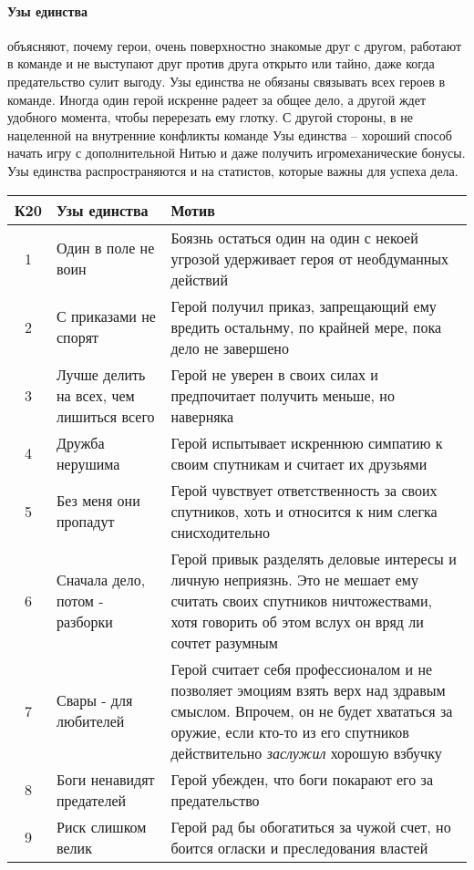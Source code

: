\paragraph{Узы единства} объясняют, почему герои, очень поверхностно знакомые друг с другом, работают в команде и не выступают друг против друга открыто или тайно, даже когда предательство сулит выгоду. Узы единства не обязаны связывать всех героев в команде. Иногда один герой искренне радеет за общее дело, а другой ждет удобного момента, чтобы перерезать ему глотку. С другой стороны, в не нацеленной на внутренние конфликты команде Узы единства – хороший способ начать игру с дополнительной Нитью и даже получить игромеханические бонусы. Узы единства распространяются и на статистов, которые важны для успеха дела.
\begin{center}
\begin{tabular}{ |c|p{4cm}|p{10cm}| }
\hline
\textbf{К20} & \textbf{Узы единства} & \textbf{Мотив} \\ \hline
1 & Один в поле не воин & Боязнь остаться один на один с некоей угрозой удерживает героя от необдуманных действий \\ \hline
2 & С приказами не спорят & Герой получил приказ, запрещающий ему вредить остальнму, по крайней мере, пока дело не завершено \\ \hline
3 & Лучше делить на всех, чем лишиться всего & Герой не уверен в своих силах и предпочитает получить меньше, но наверняка \\ \hline
4 & Дружба нерушима & Герой испытывает искреннюю симпатию к своим спутникам и считает их друзьями \\ \hline
5 & Без меня они пропадут & Герой чувствует ответственность за своих спутников, хоть и относится к ним слегка снисходительно \\ \hline
6 & Сначала дело, потом - разборки & Герой привык разделять деловые интересы и личную неприязнь. Это не мешает ему считать своих спутников ничтожествами, хотя говорить об этом вслух он вряд ли сочтет разумным \\ \hline
7 & Свары - для любителей & Герой считает себя профессионалом и не позволяет эмоциям взять верх над здравым смыслом. Впрочем, он не будет хвататься за оружие, если кто-то из его спутников действительно \textit{заслужил} хорошую взбучку \\ \hline
8 & Боги ненавидят предателей & Герой убежден, что боги покарают его за предательство \\ \hline
9 & Риск слишком велик & Герой рад бы обогатиться за чужой счет, но боится огласки и преследования властей \\ \hline

\end{tabular}
\end{center}
